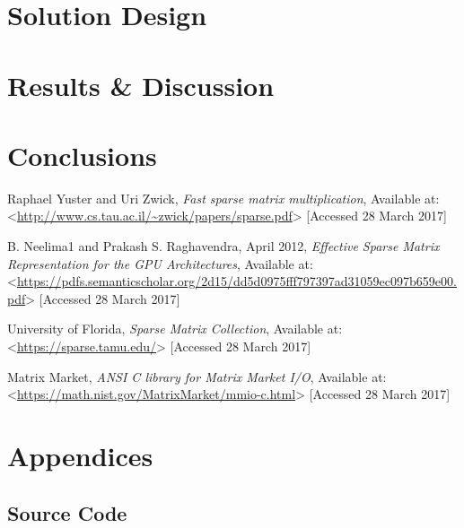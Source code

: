 \documentclass[12pt]{article}
\begin{document}
\section*{Solution Design}


\section*{Results \& Discussion}


\pagebreak
\section*{Conclusions}

 

\newpage
\begin{thebibliography}{0}

Raphael Yuster and Uri Zwick, \textit{Fast sparse matrix multiplication}, Available at: <\url{http://www.cs.tau.ac.il/~zwick/papers/sparse.pdf}> [Accessed 28 March 2017]

B. Neelima1 and Prakash S. Raghavendra, April 2012,  \textit{Effective Sparse Matrix Representation for the
GPU Architectures}, Available at: <\url{https://pdfs.semanticscholar.org/2d15/dd5d0975fff797397ad31059ec097b659e00.pdf}> [Accessed 28 March 2017]

University of Florida, \textit{Sparse Matrix Collection}, Available at: <\url{https://sparse.tamu.edu/}> [Accessed 28 March 2017]

Matrix Market, \textit{ANSI C library for Matrix Market I/O}, Available at: <\url{https://math.nist.gov/MatrixMarket/mmio-c.html}> [Accessed 28 March 2017]



\end{thebibliography}
\newpage

\section*{Appendices}


\newpage

\subsection*{Source Code}


\end{document}
